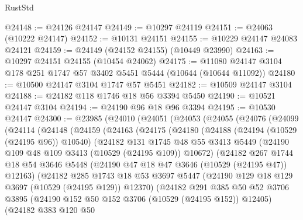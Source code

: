 \begin{lexlean}{RustStd}
\begin{coremodule}
@24148 := @24126 @24147
@24149 := @10297 @24119
@24151 := @24063 (@10222 @24147)
@24152 := @10131 @24151
@24155 := @10229 @24147 @24083 @24121
@24159 := @24149 (@24152 @24155) (@10449 @23990)
@24163 := @10297 @24151 @24155 (@10454 @24062)
@24175 := @11080 @24147 @3104 @178 @251 @1747 @57 @3402 @5451 @5444 (@10644 (@10644 @11092))
@24180 := @10500 @24147 @3104 @1747 @57 @5451
@24182 := @10509 @24147 @3104
@24188 := @24182 @118 @1746 @18 @56 @3394 @5450
@24190 := @10521 @24147 @3104
@24194 := @24190 @96 @18 @96 @3394
@24195 := @10530 @24147
@24300 := @23985
    (@24010
      (@24051
        (@24053
          (@24055
            (@24076
              (@24099
                (@24114
                  (@24148
                    (@24159
                      (@24163
                        (@24175
                          (@24180
                            (@24188
                              (@24194 (@10529 (@24195 @96)) @10540)
                              (@24182
                                @131
                                @1745
                                @48
                                @55
                                @3413
                                @5449
                                (@24190 @109 @48 @109 @3413 (@10529 (@24195 @109)) @10672)
                                (@24182
                                  @267
                                  @1744
                                  @18
                                  @54
                                  @3646
                                  @5448
                                  (@24190 @47 @18 @47 @3646 (@10529 (@24195 @47)) @12163)
                                  (@24182
                                    @285
                                    @1743
                                    @18
                                    @53
                                    @3697
                                    @5447
                                    (@24190 @129 @18 @129 @3697 (@10529 (@24195 @129)) @12370)
                                    (@24182
                                      @291
                                      @385
                                      @50
                                      @52
                                      @3706
                                      @3895
                                      (@24190 @152 @50 @152 @3706 (@10529 (@24195 @152)) @12405)
                                      (@24182
                                        @383
                                        @120
                                        @50

\end{coremodule}
\end{lexlean}
